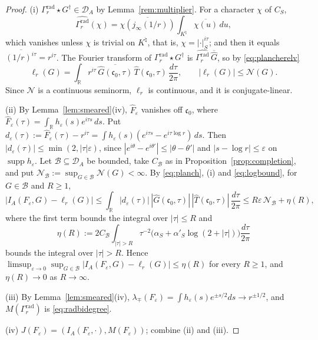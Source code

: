 \documentclass[11pt]{amsart}
\theoremstyle{definition}
\newcommand{\R}{\mathbb R}
\newcommand{\supp}{\operatorname{supp}}
\newcommand{\Knat}{K^{\natural}}
\newcommand{\DA}{\mathcal D_A}
\begin{document}
\begin{proof}
(i) $\Gamma_r^{\mathrm{rad}}\star G^\dagger\in\DA$ by
Lemma~\ref{rem:multiplier}. For a character $\chi$ of $C_S$,
\[
  \widehat{\Gamma_r^{\mathrm{rad}}}(\chi)
   =\overline{\chi(j_\infty(1/r))}\int_{\Knat}\overline{\chi(u)}\,du,
\]
which vanishes unless $\chi$ is trivial on $\Knat$, that is,
$\chi=|\cdot|_S^{i\tau}$; and then it equals
$\overline{(1/r)^{i\tau}}=r^{i\tau}$. The Fourier transform of
$\Gamma_r^{\mathrm{rad}}\star G^\dagger$ is
$\widehat{\Gamma_r^{\mathrm{rad}}}\,\overline{\widehat G}$, so by
\eqref{eq:plancherelv}
\[
  \ell_r(G)=\int_{\R}r^{i\tau}\,\overline{\widehat G(\mathfrak c_0,\tau)}\,
    \widehat T(\mathfrak c_0,\tau)\,\frac{d\tau}{2\pi},\qquad
  |\ell_r(G)|\le\mathcal N(G).
\]
Since $\mathcal N$ is a continuous seminorm, $\ell_r$ is continuous, and it
is conjugate-linear.

(ii) By Lemma~\ref{lem:smeared}(iv), $\widehat F_\varepsilon$ vanishes off
$\mathfrak c_0$, where
$\widehat F_\varepsilon(\tau)=\int_\R h_\varepsilon(s)e^{i\tau s}\,ds$. Put
$d_\varepsilon(\tau):=\widehat F_\varepsilon(\tau)-r^{i\tau}
=\int h_\varepsilon(s)(e^{i\tau s}-e^{i\tau\log r})\,ds$. Then
$|d_\varepsilon(\tau)|\le\min(2,|\tau|\varepsilon)$, since
$|e^{i\theta}-e^{i\theta'}|\le|\theta-\theta'|$ and $|s-\log r|\le\varepsilon$
on $\supp h_\varepsilon$. Let $\mathcal B\subseteq\DA$ be bounded, take $C_{\mathcal B}$ as in
Proposition~\ref{prop:completion}, and put
$\mathcal N_{\mathcal B}:=\sup_{G\in\mathcal B}\mathcal N(G)<\infty$. By \eqref{eq:planch}, (i)
and \eqref{eq:logbound}, for $G\in\mathcal B$ and $R\ge1$,
\[
  \bigl|I_A(F_\varepsilon,G)-\ell_r(G)\bigr|
   \le\int_{\R}|d_\varepsilon(\tau)|\,|\widehat G(\mathfrak c_0,\tau)|\,
     |\widehat T(\mathfrak c_0,\tau)|\,\frac{d\tau}{2\pi}
   \le R\varepsilon\,\mathcal N_{\mathcal B}+\eta(R),
\]
where the first term bounds the integral over $|\tau|\le R$ and
\[
  \eta(R):=2C_{\mathcal B}\int_{|\tau|>R}\tau^{-2}\bigl(\alpha_S+\alpha'_S\log(2+|\tau|)\bigr)
    \frac{d\tau}{2\pi}
\]
bounds the integral over $|\tau|>R$. Hence
$\limsup_{\varepsilon\to0}\sup_{G\in\mathcal B}|I_A(F_\varepsilon,G)-\ell_r(G)|
\le\eta(R)$ for every $R\ge1$, and $\eta(R)\to0$ as $R\to\infty$.

(iii) By Lemma~\ref{lem:smeared}(iv),
$\lambda_\mp(F_\varepsilon)=\int h_\varepsilon(s)e^{\pm s/2}ds\to r^{\pm1/2}$,
and $M(\Gamma_r^{\mathrm{rad}})$ is \eqref{eq:radbidegree}.

(iv) $J(F_\varepsilon)=(I_A(F_\varepsilon,\cdot),M(F_\varepsilon))$; combine
(ii) and (iii).
\end{proof}
\end{document}
